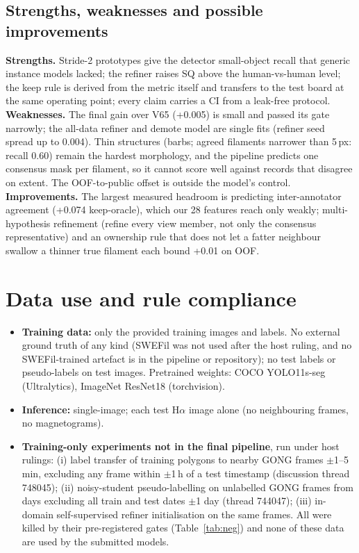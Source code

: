 \documentclass[sigconf]{acmart}
\begin{document}
\subsection{Strengths, weaknesses and possible improvements}
\textbf{Strengths.} Stride-2 prototypes give the detector small-object recall that generic instance models lacked; the refiner raises SQ above the human-vs-human level; the keep rule is derived from the metric itself and transfers to the test board at the same operating point; every claim carries a CI from a leak-free protocol.
\textbf{Weaknesses.} The final gain over V65 (+0.005) is small and passed its gate narrowly; the all-data refiner and demote model are single fits (refiner seed spread up to 0.004). Thin structures (barbs; agreed filaments narrower than 5\,px: recall 0.60) remain the hardest morphology, and the pipeline predicts one consensus mask per filament, so it cannot score well against records that disagree on extent. The OOF-to-public offset is outside the model's control.
\textbf{Improvements.} The largest measured headroom is predicting inter-annotator agreement (+0.074 keep-oracle), which our 28 features reach only weakly; multi-hypothesis refinement (refine every view member, not only the consensus representative) and an ownership rule that does not let a fatter neighbour swallow a thinner true filament each bound +0.01 on OOF.

\section{Data use and rule compliance}
\begin{itemize}
\item \textbf{Training data:} only the provided training images and labels. No external ground truth of any kind (SWEFil was not used after the host ruling, and no SWEFil-trained artefact is in the pipeline or repository); no test labels or pseudo-labels on test images. Pretrained weights: COCO YOLO11s-seg (Ultralytics), ImageNet ResNet18 (torchvision).
\item \textbf{Inference:} single-image; each test H$\alpha$ image alone (no neighbouring frames, no magnetograms).
\item \textbf{Training-only experiments not in the final pipeline}, run under host rulings: (i) label transfer of training polygons to nearby GONG frames $\pm$1--5 min, excluding any frame within $\pm$1\,h of a test timestamp (discussion thread 748045); (ii) noisy-student pseudo-labelling on unlabelled GONG frames from days excluding all train and test dates $\pm$1 day (thread 744047); (iii) in-domain self-supervised refiner initialisation on the same frames. All were killed by their pre-registered gates (Table~\ref{tab:neg}) and none of these data are used by the submitted models.
\end{itemize}
\end{document}
